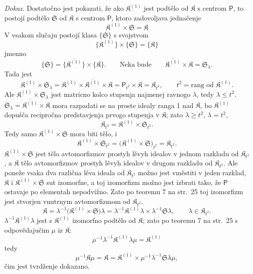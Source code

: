 \documentclass[11pt]{article}
\begin{document}
\emph{Dokaz.} Dostatočno jest pokazati, že ako \(\mathfrak K^{(1)}\) jest podtělo od \(\mathfrak K\) s centrom \(\mathsf P\), to postojí podtělo \(\mathfrak S\) od \(\mathfrak K\) s centrom \(\mathsf P\), ktoro zadovoljava jednačenje
\[
\mathfrak K^{(1)}\times\mathfrak S=\mathfrak K
\]
V vsakom slučaju postojí klasa \(\{\mathfrak S\}\) s svojstvom
\[
\{\mathfrak K^{(1)}\}\times\{\mathfrak S\}=\{\mathfrak K\}
\]
jmenno
\[
\{\mathfrak S\}=\{\overline{\mathfrak K^{(1)}}\}\times\{\mathfrak K\}.
\qquad
\text{Neka bude}\qquad
\overline{\mathfrak K^{(1)}}\times\mathfrak K=\mathfrak S_\lambda.
\]
Tada jest
\[
\mathfrak K^{(1)}\times\mathfrak S_\lambda
=\mathfrak K^{(1)}\times\overline{\mathfrak K^{(1)}}\times\mathfrak K
=\mathsf P_{t^2}\times\mathfrak K
=\mathfrak K_{t^2},
\qquad
t^2=\text{rang od }\mathfrak K^{(1)}.
\]
Ale \(\mathfrak K^{(1)}\times\mathfrak S_\lambda\) jest matricno kolco stupenja najmenej ravnogo \(\lambda\), tedy \(\lambda\leq t^2\). \(\mathfrak S_\lambda=\overline{\mathfrak K^{(1)}}\times\mathfrak K\) mora razpadati se na proste idealy ranga 1 nad \(\mathfrak K\), bo \(\overline{\mathfrak K^{(1)}}\) dopušča recipročna predstavjenja prvogo stupenja v \(\mathfrak K\); zato \(\lambda\geq t^2\), \(\lambda=t^2\),
\[
\mathfrak K_{t^2}=\mathfrak K^{(1)}\times\mathfrak S_{t^2}.
\]
Tedy samo \(\mathfrak K^{(1)}\times\mathfrak S\) mora biti tělo, i
\[
\mathfrak K^{(1)}\times\mathfrak S_{t^2}
=\bigl(\mathfrak K^{(1)}\times\mathfrak S\bigr)_{t^2}
=\mathfrak K_{t^2}.
\]
\(\mathfrak K^{(1)}\times\mathfrak S\) jest tělo avtomorfizmov prostyh lěvyh idealov v jednom razkladu od \(\mathfrak K_{t^2}\), a \(\mathfrak K\) tělo avtomorfizmov prostyh lěvyh idealov v drugom razkladu od \(\mathfrak K_{t^2}\). Ale poneže vsaka dva različna lěva ideala od \(\mathfrak K_{t^2}\) možno jest vměstiti v jeden razklad, \(\mathfrak K\) i \(\mathfrak K^{(1)}\times\mathfrak S\) sut izomorfne, a toj izomorfizm možno jest izbrati tako, že \(\mathsf P\) ostavaje po elementah nepodvižno. Zato po teoremu 7 na str.~25 toj izomorfizm jest stvorjen vnutrnym avtomorfizmom od \(\mathfrak K_{t^2}\).
\[
\mathfrak K
=\lambda^{-1}\bigl(\mathfrak K^{(1)}\times\mathfrak S\bigr)\lambda
=\lambda^{-1}\mathfrak K^{(1)}\lambda\times\lambda^{-1}\mathfrak S\lambda,
\qquad
\lambda\in\mathfrak K_{t^2}.
\]
\(\lambda^{-1}\mathfrak K^{(1)}\lambda\) jest s \(\mathfrak K^{(1)}\) izomorfno podtělo od \(\mathfrak K\); zato po teoremu 7 na str.~25 s odpovědajučim \(\mu\) iz \(\mathfrak K\):
\[
\mu^{-1}\lambda^{-1}\mathfrak K^{(1)}\lambda\mu=\mathfrak K^{(1)}
\]
tedy
\[
\mu^{-1}\mathfrak K\mu
=\mathfrak K
=\mathfrak K^{(1)}\times\mu^{-1}\lambda^{-1}\mathfrak S\lambda\mu,
\]
čim jest tvrdženje dokazano.
\end{document}
